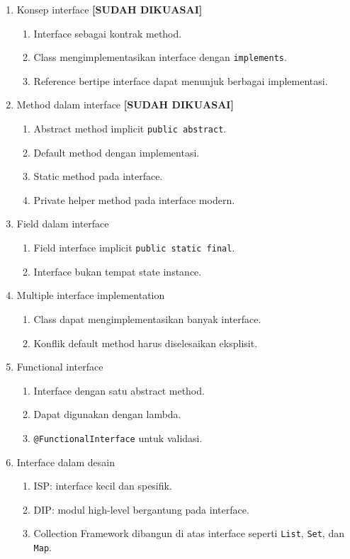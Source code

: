 \begin{enumerate}
    \item Konsep interface \textbf{[SUDAH DIKUASAI]}
    \begin{enumerate}
        \item Interface sebagai kontrak method.
        \item Class mengimplementasikan interface dengan \texttt{implements}.
        \item Reference bertipe interface dapat menunjuk berbagai implementasi.
    \end{enumerate}
    \item Method dalam interface \textbf{[SUDAH DIKUASAI]}
    \begin{enumerate}
        \item Abstract method implicit \texttt{public abstract}.
        \item Default method dengan implementasi.
        \item Static method pada interface.
        \item Private helper method pada interface modern.
    \end{enumerate}
    \item Field dalam interface
    \begin{enumerate}
        \item Field interface implicit \texttt{public static final}.
        \item Interface bukan tempat state instance.
    \end{enumerate}
    \item Multiple interface implementation
    \begin{enumerate}
        \item Class dapat mengimplementasikan banyak interface.
        \item Konflik default method harus diselesaikan eksplisit.
    \end{enumerate}
    \item Functional interface
    \begin{enumerate}
        \item Interface dengan satu abstract method.
        \item Dapat digunakan dengan lambda.
        \item \texttt{@FunctionalInterface} untuk validasi.
    \end{enumerate}
    \item Interface dalam desain
    \begin{enumerate}
        \item ISP: interface kecil dan spesifik.
        \item DIP: modul high-level bergantung pada interface.
        \item Collection Framework dibangun di atas interface seperti \texttt{List}, \texttt{Set}, dan \texttt{Map}.
    \end{enumerate}
\end{enumerate}

